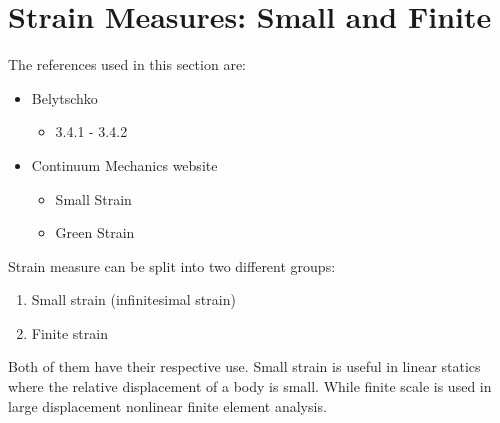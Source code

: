 \section{Strain Measures: Small and Finite}
\label{subsec:strainmeasures}
\begin{sectionref}
The references used in this section are:
    \begin{itemize}
        \item Belytschko \cite{Belytschko_Liu_Moran_Elkhodary_2014}
        \begin{itemize}
            \item 3.4.1 - 3.4.2
        \end{itemize}
        \item Continuum Mechanics website \cite{McGinty}
        \begin{itemize}
            \item Small Strain
            \item Green Strain
        \end{itemize}
    \end{itemize}
\end{sectionref}

Strain measure can be split into two different groups:
\begin{enumerate}
    \item Small strain (infinitesimal strain)
    \item Finite strain
\end{enumerate}

Both of them have their respective use. Small strain is useful in linear statics where the relative displacement of a body is small. While finite scale is used in large displacement nonlinear finite element analysis. 

